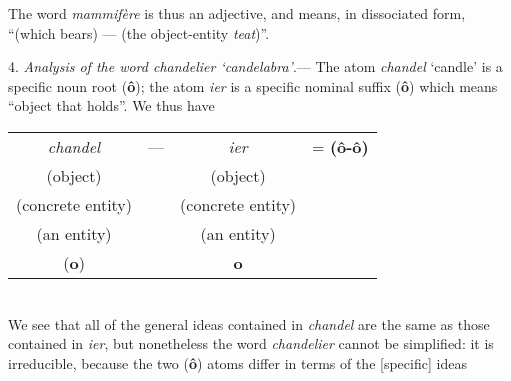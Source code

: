 \begin{sloppypar}
{  The word \emph{mammifère} is thus an adjective, and means, in
  dissociated form, ``(which bears) --- (the object-entity
  \emph{teat})''.

  4. \emph{Analysis of the word \emph{chandelier} `candelabra'}.---
  The atom \emph{chandel} `candle' is a specific noun root
  (\textbf{ô}); the atom \emph{ier} is a specific nominal suffix
  (\textbf{ô}) which means ``object
  that holds''. We thus have\\[1ex]

  \noindent
  {\setlength{\tabcolsep}{0pt} {\small
      \begin{tabular}[t]{cccc}
        \emph{chandel}&---&\emph{ier}&= \textbf{(ô-ô)}\\
        (object)&&(object)\\
        (concrete entity)&&(concrete entity)\\
        (an entity)&&(an entity)\\
        (\textbf{o})&&\textbf{o}
      \end{tabular}}}
  \\[1ex]

  We see that all of the general ideas contained in \emph{chandel} are
  the same as those contained in \emph{ier}, but nonetheless the word
  \emph{chandelier} cannot be simplified: it is irreducible, because the
  two (\textbf{ô}) atoms differ in terms of the [specific] ideas

}

\end{sloppypar}
